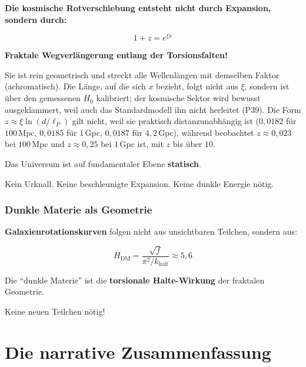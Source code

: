 	\begin{keyresult}
		\textbf{Die kosmische Rotverschiebung entsteht nicht durch Expansion, sondern durch:}

		\begin{equation}
			\boxed{1 + z = e^{\xi x}}
		\end{equation}

		\textbf{Fraktale Wegverlängerung entlang der Torsionsfalten!}

		Sie ist rein geometrisch und streckt alle Wellenlängen mit demselben Faktor (achromatisch). Die Länge, auf die sich $x$ bezieht, folgt nicht aus $\xi$, sondern ist über den gemessenen $H_0$ kalibriert; der kosmische Sektor wird bewusst ausgeklammert, weil auch das Standardmodell ihn nicht herleitet (P39). Die Form $z \approx \xi \ln(d/\ell_P)$ gilt nicht, weil sie praktisch distanzunabhängig ist ($0{,}0182$ für $100$\,Mpc, $0{,}0185$ für $1$\,Gpc, $0{,}0187$ für $4{,}2$\,Gpc), während beobachtet $z \approx 0{,}023$ bei $100$\,Mpc und $z \approx 0{,}25$ bei $1$\,Gpc ist, mit $z$ bis über $10$.

		\vspace{0.3cm}

		Das Universum ist auf fundamentaler Ebene \textbf{statisch}.

		Kein Urknall. Keine beschleunigte Expansion. Keine dunkle Energie nötig.
	\end{keyresult}

	\subsubsection{Dunkle Materie als Geometrie}

	\textbf{Galaxienrotationskurven} folgen nicht aus unsichtbaren Teilchen, sondern aus:

	\begin{equation}
		H_{\text{DM}} = \frac{\sqrt{f}}{\pi^2/k_{\text{halt}}} \approx 5{,}6
	\end{equation}

	Die \enquote{dunkle Materie} ist die \textbf{torsionale Halte-Wirkung} der fraktalen Geometrie.

	Keine neuen Teilchen nötig!

	\section{Die narrative Zusammenfassung}

